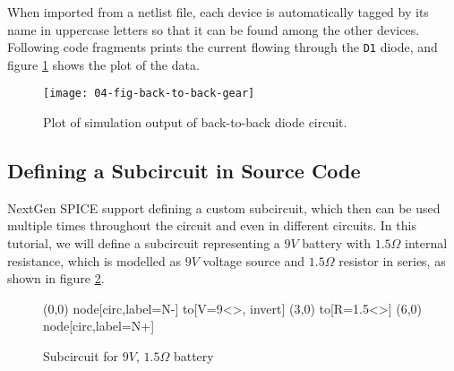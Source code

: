 When imported from a netlist file, each device is automatically tagged by its name in uppercase letters so that it can be found among the other devices. Following code fragments prints the current flowing through the \texttt{D1} diode, and figure \ref{fig:04-fig-back-to-back-gear} shows the plot of the data.


\begin{figure}[h]
	\centering
	\texttt{[image: 04-fig-back-to-back-gear]}
	\caption{Plot of simulation output of back-to-back diode circuit.}
	\label{fig:04-fig-back-to-back-gear}
\end{figure}

\subsection{Defining a Subcircuit in Source Code}

NextGen SPICE support defining a custom subcircuit, which then can be used multiple times throughout the circuit and even in different circuits. In this tutorial, we will define a subcircuit representing a $9V$ battery with $1.5\Omega$ internal resistance, which is modelled as $9V$ voltage source and $1.5\Omega$ resistor in series, as shown in figure \ref{fig:userdocs:battery}.

\begin{figure}[h]
	\begin{circuitdev}
		(0,0) node[circ,label=N-]{} to[V=9<\volt>, invert] (3,0) to[R=1.5<\ohm>] (6,0) node[circ,label=N+]{}
	\end{circuitdev}
	\caption{Subcircuit for $9V$, $1.5\Omega$ battery}
	\label{fig:userdocs:battery}
\end{figure}

